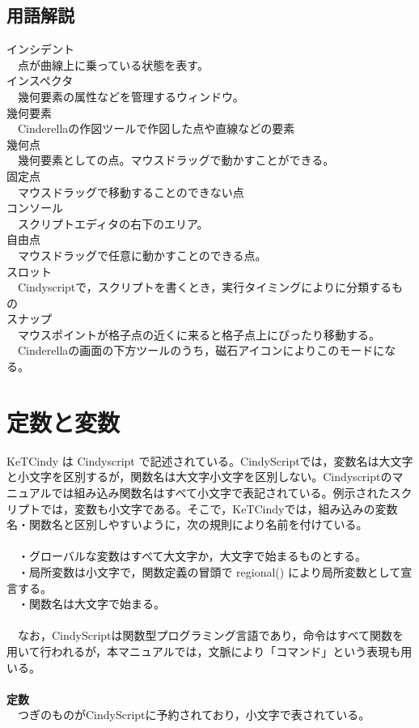 \documentclass[papersize,a4paper,12pt,uplatex]{jsarticle}
\begin{document}
\subsection{用語解説} 
インシデント\\ 
　点が曲線上に乗っている状態を表す。\\
インスペクタ\\
　幾何要素の属性などを管理するウィンドウ。\\
幾何要素　　\\
　Cinderellaの作図ツールで作図した点や直線などの要素\\
幾何点　\\
　幾何要素としての点。マウスドラッグで動かすことができる。\\
固定点\\
　マウスドラッグで移動することのできない点\\
コンソール\\
　スクリプトエディタの右下のエリア。\\
自由点\\
　マウスドラッグで任意に動かすことのできる点。\\
スロット　　\\
　Cindyscriptで，スクリプトを書くとき，実行タイミングによりに分類するもの\\ 
スナップ　\\
　マウスポイントが格子点の近くに来ると格子点上にぴったり移動する。\\
　Cinderellaの画面の下方ツールのうち，磁石アイコンによりこのモードになる。\\

\newpage
\section{定数と変数}
KeTCindy は Cindyscript で記述されている。CindyScriptでは，変数名は大文字と小文字を区別するが，関数名は大文字小文字を区別しない。Cindyscriptのマニュアルでは組み込み関数名はすべて小文字で表記されている。例示されたスクリプトでは，変数も小文字である。そこで，KeTCindyでは，組み込みの変数名・関数名と区別しやすいように，次の規則により名前を付けている。\\
　\\
　・グローバルな変数はすべて大文字か，大文字で始まるものとする。\\
　・局所変数は小文字で，関数定義の冒頭で regional() により局所変数として宣言する。\\
　・関数名は大文字で始まる。\\
　\\
　なお，CindyScriptは関数型プログラミング言語であり，命令はすべて関数を用いて行われるが，本マニュアルでは，文脈により「コマンド」という表現も用いる。\\
　\\
{\bf 定数} \\
　つぎのものがCindyScriptに予約されており，小文字で表されている。\\
\end{document}
